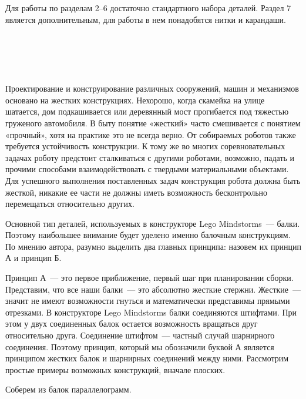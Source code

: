 Для работы по разделам 2--6 достаточно стандартного набора деталей. Раздел 7 является дополнительным, для работы в нем понадобятся нитки и карандаши.\\\\

\\\\

{\hypertarget{lesson19x2}{}}\\\\

Проектирование и конструирование различных сооружений, машин и механизмов основано на жестких конструкциях. Нехорошо, когда скамейка на улице шатается, дом подкашивается или деревянный мост прогибается под тяжестью груженого автомобиля. В быту понятие «жесткий» часто смешивается с понятием «прочный», хотя на практике это не всегда верно. От собираемых роботов также требуется устойчивость конструкции. К тому же во многих соревновательных задачах роботу предстоит сталкиваться с другими роботами, возможно, падать и прочими способами взаимодействовать с твердыми материальными объектами. Для успешного выполнения поставленных задач конструкция робота должна быть жесткой, никакие ее части не должны иметь возможность бесконтрольно перемещаться относительно других. 

Основной тип деталей, используемых в конструкторе Lego Mindstorms~--- балки. Поэтому наибольшее внимание будет уделено именно балочным конструкциям. По мнению автора, разумно выделить два главных принципа: назовем их принцип А и принцип Б.

Принцип А~--- это первое приближение, первый шаг при планировании сборки. Представим, что все наши балки~--- это абсолютно жесткие стержни. Жесткие~--- значит не имеют возможности гнуться и математически представимы прямыми отрезками. В конструкторе Lego Mindstorms балки соединяются штифтами. При этом у двух соединенных балок остается возможность вращаться друг относительно друга. Соединение штифтом~--- частный случай шарнирного соединения. Поэтому принцип, который мы обозначили буквой А является принципом жестких балок и шарнирных соединений между ними. Рассмотрим простые примеры возможных конструкций, вначале плоских.

Соберем из балок параллелограмм.\\\\

\\\\

